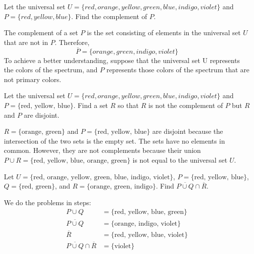 \begin{example}
    Let the universal set $U = \{red, orange, yellow, green, blue, indigo, violet\}$ and $P = \{red, yellow, blue\}$. Find the complement of $P$.
\end{example}
\begin{solution}
    The complement of a set $P$ is the set consisting of elements in the universal set $U$ that are not in $P$. Therefore,
    \[
        \overline{P} = \{orange, green, indigo, violet\}
    \]
    To achieve a better understanding, suppose that the universal set U represents the colors of the spectrum, and $P$ represents those colors of the spectrum that are not primary colors.
\end{solution}

\begin{example}
    Let the universal set \( U = \{ red, orange, yellow, green, blue, indigo, violet \} \) and \( P = \{ \text{red, yellow, blue} \} \). Find a set \( R \) so that \( R \) is not the complement of \( P \) but \( R \) and \( P \) are disjoint.
\end{example}
\begin{solution}
    \( R = \{ \text{orange, green} \} \) and \( P = \{ \text{red, yellow, blue} \} \) are disjoint because the intersection of the two sets is the empty set. The sets have no elements in common. However, they are not complements because their union \( P \cup R = \{ \text{red, yellow, blue, orange, green} \} \) is not equal to the universal set \( U \).
\end{solution}

\begin{example}
    Let \( U = \{ \text{red, orange, yellow, green, blue, indigo, violet} \} \), \( P = \{ \text{red, yellow, blue} \} \), \( Q = \{ \text{red, green} \} \), and \( R = \{ \text{orange, green, indigo} \} \). Find \( \overline{P \cup Q} \cap \overline{R} \).
\end{example}
\begin{solution}
    We do the problems in steps:
    \[
        \begin{aligned}
            P \cup Q                              & = \{ \text{red, yellow, blue, green} \}  \\
            \overline{P \cup Q}                   & = \{ \text{orange, indigo, violet} \}    \\
            \overline{R}                          & = \{ \text{red, yellow, blue, violet} \} \\
            \overline{P \cup Q} \cap \overline{R} & = \{ \text{violet} \}
        \end{aligned}
    \]
\end{solution}

